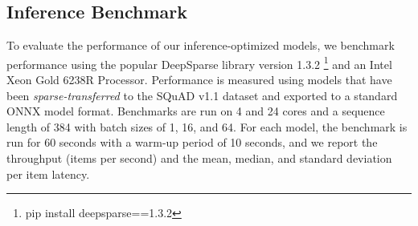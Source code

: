 \subsection{Inference Benchmark}
To evaluate the performance of our inference-optimized models, we benchmark performance using the popular DeepSparse library version 1.3.2 \footnote{pip install deepsparse==1.3.2} and an Intel Xeon Gold 6238R Processor. Performance is measured using models that have been \textit{sparse-transferred} to the SQuAD v1.1 dataset and exported to a standard ONNX model format. Benchmarks are run on 4 and 24 cores and a sequence length of 384 with batch sizes of 1, 16, and 64. For each model, the benchmark is run for 60 seconds with a warm-up period of 10 seconds, and we report the throughput (items per second) and the mean, median, and standard deviation per item latency. 

